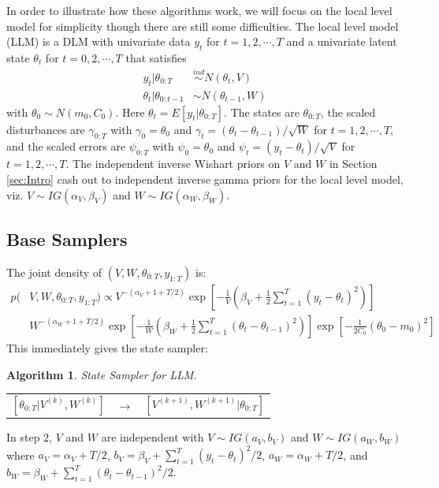 \documentclass{article}
\newtheorem{alg}{Algorithm}
\begin{document}
In order to illustrate how these algorithms work, we will focus on the local level model for simplicity though there are still some difficulties. The local level model (LLM) is a DLM with univariate data $y_t$ for $t=1,2,\cdots,T$ and a univariate latent state $\theta_t$ for $t=0,2,\cdots,T$ that satisfies
\begin{align}
  y_t |\theta_{0:T}& \stackrel{ind}{\sim} N(\theta_t,V) \label{llmobseq}\\
  \theta_t |\theta_{0:t-1}& \sim N(\theta_{t-1},W) \label{llmsyseq}
\end{align}
with $\theta_0\sim N(m_0,C_0)$. Here $\theta_t=E[y_t|\theta_{0:T}]$. The states are $\theta_{0:T}$, the scaled disturbances are $\gamma_{0:T}$ with $\gamma_0=\theta_0$ and $\gamma_t=(\theta_t - \theta_{t-1})/\sqrt{W}$ for $t=1,2,\cdots,T$, and the scaled errors are $\psi_{0:T}$ with $\psi_0=\theta_0$ and $\psi_t=(y_t - \theta_t)/\sqrt{V}$ for $t=1,2,\cdots,T$. The independent inverse Wishart priors on $V$ and $W$ in Section \ref{sec:Intro} cash out to independent inverse gamma priors for the local level model, viz. $V\sim IG(\alpha_V,\beta_V)$ and $W\sim IG(\alpha_W,\beta_W)$. 

\subsection{Base Samplers}\label{sec:LLMbase}

The joint density of $(V,W,\theta_{0:T},y_{1:T})$ is:
\begin{align}
  p(&V,W,\theta_{0:T},y_{1:T}) \propto V^{-(\alpha_V + 1 + T/2)} \exp\left[-\frac{1}{V}\left(\beta_V + \frac{1}{2}\textstyle\sum_{t=1}^T(y_t - \theta_{t})^2\right)\right]\nonumber\\
  &W^{-(\alpha_W + 1 + T/2)}\exp\left[-\frac{1}{W}\left(\beta_W + \frac{1}{2}\textstyle\sum_{t=1}^T(\theta_t - \theta_{t-1})^2\right) \right] \exp\left[-\frac{1}{2C_0}(\theta_0 - m_0)^2\right]\label{llmstatejoint}
\end{align}
This immediately gives the state sampler:
\begin{alg}State Sampler for LLM.\label{alg:LLMstate}\\
  \begin{center}
    \begin{tabular}{lll}
      $[\theta_{0:T}|V^{(k)},W^{(k)}]$& $\to$& $[V^{(k+1)},W^{(k+1)}|\theta_{0:T}]$
    \end{tabular}
  \end{center}
\end{alg}
In step 2, $V$ and $W$ are independent with $V\sim IG(a_V,b_V)$ and $W\sim IG(a_W, b_W)$ where $a_V = \alpha_V + T/2$, $b_V = \beta_V + \sum_{t=1}^T(y_t - \theta_t)^2/2$, $a_W = \alpha_W + T/2$, and $b_W = \beta_W + \sum_{t=1}^T(\theta_t - \theta_{t-1})^2/2$.
\end{document}
